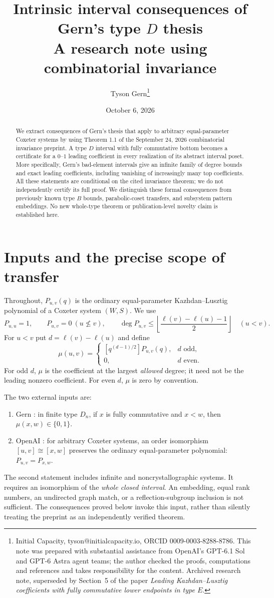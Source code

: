 \documentclass[11pt]{article}
\title{Intrinsic interval consequences of Gern's type $D$ thesis\\
\large A research note using combinatorial invariance}
\author{Tyson Gern\thanks{Initial Capacity, tyson@initialcapacity.io, ORCID 0009-0003-8288-8786. This note was prepared with substantial assistance from OpenAI's GPT-6.1 Sol and GPT-6 Astra agent teams; the author checked the proofs, computations and references and takes responsibility for the content. Archived research note, superseded by Section~5 of the paper \emph{Leading Kazhdan--Lusztig coefficients with fully commutative lower endpoints in type $E$}.}}
\date{October 6, 2026}
\theoremstyle{definition}\newtheorem{definition}[theorem]{Definition}
\theoremstyle{remark}\newtheorem{remark}[theorem]{Remark}
\begin{document}
\maketitle
\begin{abstract}
We extract consequences of Gern's thesis that apply to arbitrary equal-parameter
Coxeter systems by using Theorem 1.1 of the September 24, 2026 combinatorial
invariance preprint. A type $D$ interval with fully commutative bottom becomes
a certificate for a $0$--$1$ leading coefficient in every realization of its
abstract interval poset. More specifically, Gern's bad-element intervals give
an infinite family of degree bounds and exact leading coefficients, including
vanishing of increasingly many top coefficients. All these statements are
conditional on the cited invariance theorem; we do not independently certify
its full proof. We distinguish these formal consequences from previously
known type $B$ bounds, parabolic-coset transfers, and subsystem pattern
embeddings. No new whole-type theorem or publication-level novelty claim is
established here.
\end{abstract}

\section{Inputs and the precise scope of transfer}
Throughout, $P_{u,v}(q)$ is the ordinary equal-parameter Kazhdan--Lusztig
polynomial of a Coxeter system $(W,S)$. We use
\[
 P_{u,u}=1,\qquad P_{u,v}=0\ (u\not\leq v),\qquad
 \deg P_{u,v}\leq\left\lfloor\frac{\ell(v)-\ell(u)-1}{2}\right\rfloor
 \quad(u<v).
\]
For $u<v$ put $d=\ell(v)-\ell(u)$ and define
\[
 \mu(u,v)=\begin{cases}
 [q^{(d-1)/2}]P_{u,v}(q),&d\text{ odd},\\
 0,&d\text{ even}.
 \end{cases}
\]
For odd $d$, $\mu$ is the coefficient at the largest \emph{allowed}
degree; it need not be the leading nonzero coefficient. For even
$d$, $\mu$ is zero by convention.

The two external inputs are:
\begin{enumerate}
\item Gern \cite[Theorem 4.5.11]{gern}: in finite type $D_n$, if $x$ is
fully commutative and $x<w$, then $\mu(x,w)\in\{0,1\}$.
\item OpenAI \cite[Theorem 1.1]{ci}: for arbitrary Coxeter systems,
an order isomorphism $[u,v]\cong[x,w]$ preserves the ordinary
equal-parameter polynomial: $P_{u,v}=P_{x,w}$.
\end{enumerate}
The second statement includes infinite and noncrystallographic systems.
It requires an isomorphism of the \emph{whole closed interval}.
An embedding, equal rank numbers, an undirected graph match, or a
reflection-subgroup inclusion is not sufficient.
The consequences proved below invoke this input, rather than silently
treating the preprint as an independently verified theorem.
\end{document}
